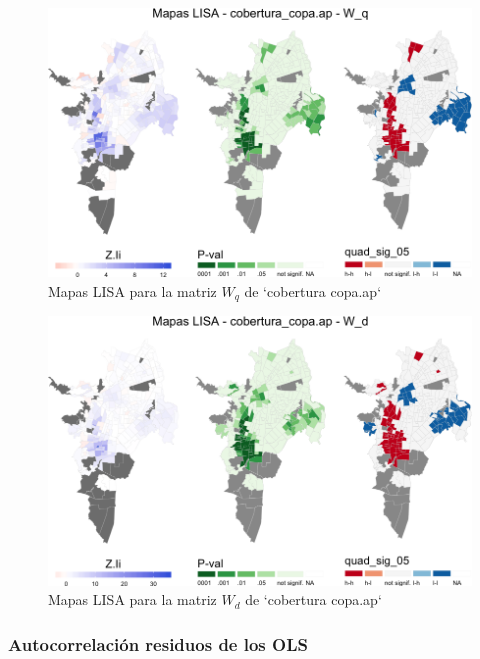 \documentclass[12pt,a4paper,openany]{book}
\theoremstyle{definition}
\theoremstyle{definition}
\theoremstyle{definition}
\theoremstyle{remark}
\begin{document}
\begin{figure}

{\centering \includegraphics[width=1\linewidth]{tesis-unigis_files/figure-latex/mapas-lisa-copaap-wq-1} 

}

\caption{Mapas LISA para la matriz $W_q$ de `cobertura copa.ap`}\label{fig:mapas-lisa-copaap-wq}
\end{figure}

\begin{figure}

{\centering \includegraphics[width=1\linewidth]{tesis-unigis_files/figure-latex/mapas-lisa-copaap-wd-1} 

}

\caption{Mapas LISA para la matriz $W_d$ de `cobertura copa.ap`}\label{fig:mapas-lisa-copaap-wd}
\end{figure}

\subsubsection{Autocorrelación residuos de los
OLS}\label{autocorrelacion-residuos-de-los-ols}
\end{document}
